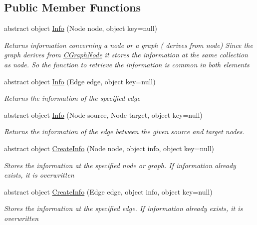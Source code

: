 \subsection*{Public Member Functions}
\begin{DoxyCompactItemize}
\item 
abstract object \hyperlink{class_graph_library_1_1_generics_1_1_abstract_graph_query_info_ac354a77c11aebe2f5fa87edadb9f05a1}{Info} (Node node, object key=null)
\begin{DoxyCompactList}\small\item\em Returns information concerning a node or a graph ( derives from node) Since the graph derives from \hyperlink{class_graph_library_1_1_c_graph_node}{C\+Graph\+Node} it stores the information at the same collection as node. So the function to retrieve the information is common in both elements \end{DoxyCompactList}\item 
abstract object \hyperlink{class_graph_library_1_1_generics_1_1_abstract_graph_query_info_a037261a2580a6f1946622de4f660e3b0}{Info} (Edge edge, object key=null)
\begin{DoxyCompactList}\small\item\em Returns the information of the specified edge \end{DoxyCompactList}\item 
abstract object \hyperlink{class_graph_library_1_1_generics_1_1_abstract_graph_query_info_a9a562930423ff0bca814ec0d13596134}{Info} (Node source, Node target, object key=null)
\begin{DoxyCompactList}\small\item\em Returns the information of the edge between the given source and target nodes. \end{DoxyCompactList}\item 
abstract object \hyperlink{class_graph_library_1_1_generics_1_1_abstract_graph_query_info_a58d00a825e3006b3066021fd992be858}{Create\+Info} (Node node, object info, object key=null)
\begin{DoxyCompactList}\small\item\em Stores the information at the specified node or graph. If information already exists, it is overwritten \end{DoxyCompactList}\item 
abstract object \hyperlink{class_graph_library_1_1_generics_1_1_abstract_graph_query_info_a39c8abaf3efbae750098bc6b0ed423da}{Create\+Info} (Edge edge, object info, object key=null)
\begin{DoxyCompactList}\small\item\em Stores the information at the specified edge. If information already exists, it is overwritten \end{DoxyCompactList}\item 

\end{DoxyCompactItemize}
